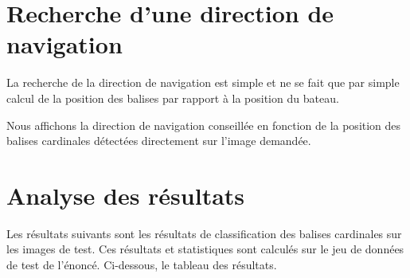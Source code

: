 \documentclass{article}
\begin{document}
\section{Recherche d'une direction de navigation}

La recherche de la direction de navigation est simple et ne se fait que par
simple calcul de la position des balises par rapport à la position du bateau.

Nous affichons la direction de navigation conseillée en fonction de la position
des balises cardinales détectées directement sur l'image demandée.

\section{Analyse des résultats}

Les résultats suivants sont les résultats de classification des balises
cardinales sur les images de test. Ces résultats et statistiques sont calculés
sur le jeu de données de test de l'énoncé. Ci-dessous, le tableau des
résultats.
\end{document}
